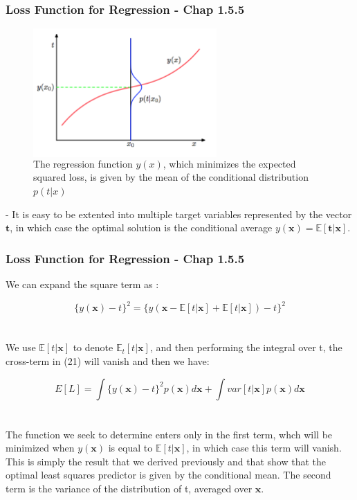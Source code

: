 \documentclass{beamer}
\begin{document}
\begin{frame}
\frametitle{Loss Function for Regression - Chap 1.5.5}
\begin{figure}
\begin{columns}
\includegraphics[width=7cm]{Figure5}
\caption{The regression function $y(x)$, which minimizes the expected squared loss, is given by the mean of the conditional distribution $p(t|x)$}
\end{columns}
\end{figure}

- It is easy to be extented into multiple target variables represented by the vector $\bm{t}$, in which case the optimal solution is the conditional average $y(\bm{x})=\mathbb{E}[\bm{t}|\bm{x}]$.

\end{frame}



\begin{frame}
\frametitle{Loss Function for Regression - Chap 1.5.5}
We can expand the square term as :

\begin{equation}
\{y(\bm{x})-t\}^2=\{y(\bm{x}-\mathbb{E}[t|\bm{x}]+\mathbb{E}[t|\bm{x}])-t\}^2
\end{equation}\\~\\

We use $\mathbb{E}[t|\bm{x}]$ to denote $\mathbb{E}_t[t|\bm{x}]$, and then performing the integral over t, the cross-term in (21) will vanish and then we have:

\begin{equation}
E[L]=\int \{y(\bm{x})-t\}^2p(\bm{x})d\bm{x}+\int var[t|\bm{x}]p(\bm{x})d\bm{x}
\end{equation}\\~\\

The function we seek to determine enters only in the first term, whch will be minimized when $y(\bm{x})$ is equal to $\mathbb{E}[t|\bm{x}]$, in which case this term will vanish. This is simply the result that we derived previously and that show that the optimal least squares predictor is given by the conditional mean. The second term is the variance of the distribution of t, averaged over $\bm{x}$.
\end{frame}
\end{document}
